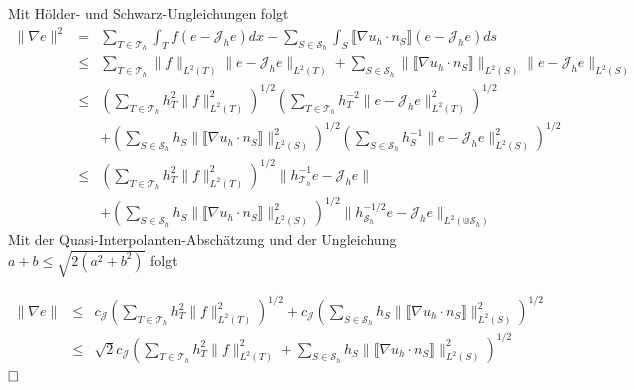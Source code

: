 Mit Hölder- und Schwarz-Ungleichungen folgt
\begin{eqnarray*}
	\|\nabla e\|^2 &=&  \sum_{T\in\mathscr{T}_h} \int_{T} f (e-\mathscr{J}_he)dx - \sum_{S\in\mathscr{S}_h} \int_{S} \llbracket \nabla u_h \cdot n_S\rrbracket (e-\mathscr{J}_he) ds \\
	&\leq&  \sum_{T\in\mathscr{T}_h}\|f\|_{L^2(T)} \|e-\mathscr{J}_he\|_{L^2(T)} + \sum_{S\in\mathscr{S}_h} \|\llbracket \nabla u_h \cdot n_S\rrbracket\|_{L^2(S)} \|e-\mathscr{J}_he\|_{L^2(S)}\\
	&\leq& \left( \sum_{T\in\mathscr{T}_h}h_T^2\|f\|_{L^2(T)}^2\right)^{1/2}\left( \sum_{T\in\mathscr{T}_h}h_T^{-2}\|e-\mathscr{J}_he\|_{L^2(T)}^2\right)^{1/2} \\
	&&+ \left(\sum_{S\in\mathscr{S}_h} h_S\|\llbracket \nabla u_h \cdot n_S\rrbracket\|_{L^2(S)}^2\right)^{1/2} \left(\sum_{S\in\mathscr{S}_h}h_S^{-1}\|e-\mathscr{J}_he\|_{L^2(S)}^2\right)^{1/2}\\
	&\leq& \left( \sum_{T\in\mathscr{T}_h}h_T^2\|f\|_{L^2(T)}^2\right)^{1/2}\|h_{\mathscr{T}_h}^{-1}e-\mathscr{J}_he\| \\
	&&+ \left(\sum_{S\in\mathscr{S}_h} h_S\|\llbracket \nabla u_h \cdot n_S\rrbracket\|_{L^2(S)}^2\right)^{1/2} \|h_{\mathscr{S}_h}^{-1/2}e-\mathscr{J}_he\|_{L^2(\Cup \mathscr{S}_h)}
\end{eqnarray*}
Mit der Quasi-Interpolanten-Abschätzung und der Ungleichung $a+b\leq \sqrt{2(a^2+b^2)}$ folgt

\begin{eqnarray*}
 \|\nabla e\| &\leq& c_{\mathscr{J}}\left( \sum_{T\in\mathscr{T}_h}h_T^2\|f\|_{L^2(T)}^2\right)^{1/2}
+ c_{\mathscr{J}}\left(\sum_{S\in\mathscr{S}_h} h_S\|\llbracket \nabla u_h \cdot n_S\rrbracket\|_{L^2(S)}^2\right)^{1/2} \\
 &\leq& \sqrt{2}c_{\mathscr{J}}\left( \sum_{T\in\mathscr{T}_h}h_T^2\|f\|_{L^2(T)}^2
 + \sum_{S\in\mathscr{S}_h} h_S\|\llbracket \nabla u_h \cdot n_S\rrbracket\|_{L^2(S)}^2\right)^{1/2}
\end{eqnarray*}
$\hfill \Box$
